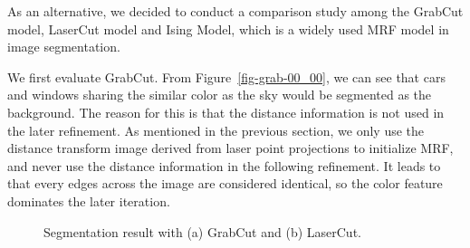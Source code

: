 \documentclass{article} %
\begin{document}
As an alternative, we decided to conduct a comparison study among the
GrabCut model, LaserCut model and Ising Model, which is a widely used
MRF model in image segmentation. 

We first evaluate GrabCut.
From Figure~\ref{fig-grab-00_00}, we can see that cars and
windows sharing the similar color as the sky would be segmented as the
background. 
The reason for this is that the distance information is not used in
the later refinement.
As mentioned in the previous section, we only
use the distance transform image derived from laser point projections
to initialize MRF, and never use the distance information in the
following refinement. It leads to that every edges across the image
are considered identical, so the color feature dominates the
later iteration.

\begin{figure}[h]
\begin{center}
\end{center}
\caption{Segmentation result with (a) GrabCut and (b) LaserCut.}
\end{figure}
\end{document}
